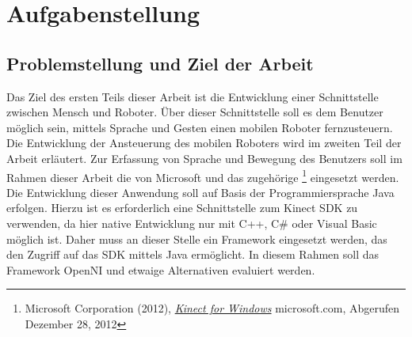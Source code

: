 \chapter{Aufgabenstellung}
\label{chap:Aufgabenstellung}

\section{Problemstellung und Ziel der Arbeit}


%

%
Das Ziel des ersten Teils dieser Arbeit ist die Entwicklung einer Schnittstelle zwischen Mensch und Roboter.
\"Uber dieser Schnittstelle soll es dem Benutzer m\"oglich sein, mittels Sprache und Gesten einen mobilen Roboter fernzusteuern. 
Die Entwicklung der Ansteuerung des mobilen Roboters wird im zweiten Teil der Arbeit erl\"autert.
\newline
Zur Erfassung von Sprache und Bewegung des Benutzers soll im Rahmen dieser Arbeit die \textit{} von Microsoft 
und das zugeh\"orige \textit{} \footnote{Microsoft Corporation (2012), \href{http://www.microsoft.com/en-us/kinectforwindows/}{\textit{Kinect for Windows}} microsoft.com, Abgerufen Dezember 28, 2012} eingesetzt werden. 
Die Entwicklung dieser Anwendung soll auf Basis der Programmiersprache Java erfolgen.
Hierzu ist es erforderlich eine Schnittstelle zum Kinect SDK zu verwenden, da hier native Entwicklung nur mit C++, C\# oder Visual Basic m\"oglich ist.
Daher muss an dieser Stelle ein Framework eingesetzt werden, das den Zugriff auf das SDK mittels Java erm\"oglicht.
In diesem Rahmen soll das Framework OpenNI und etwaige Alternativen evaluiert werden.


